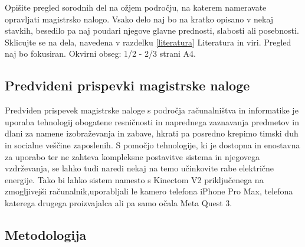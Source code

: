 \documentclass[a4paper, 12pt]{article}
\newcommand\cmnt[1]{\textcolor{munsell}{#1}}
\begin{document}
\cmnt{Opišite pregled sorodnih del na ožjem področju, na katerem nameravate opravljati magistrsko nalogo. Vsako delo naj bo na kratko opisano v nekaj stavkih, besedilo pa naj poudari njegove glavne prednosti, slabosti ali posebnosti. Sklicujte se na dela, navedena v razdelku \ref{literatura} Literatura in viri. Pregled naj bo fokusiran.  Okvirni obseg: 1/2 - 2/3 strani A4.}

\subsection{Predvideni prispevki magistrske naloge}

Predviden prispevek magistrske naloge s področja računalništva in informatike je uporaba
tehnologij obogatene resničnosti in naprednega zaznavanja predmetov in dlani za namene 
izobraževanja in zabave, hkrati pa posredno krepimo timski duh in socialne veščine 
zaposlenih. S pomočjo tehnologije, ki je dostopna in enostavna za uporabo ter ne zahteva
kompleksne postavitve sistema in njegovega vzdrževanja, se lahko tudi naredi nekaj na temo učinkovite rabe električne energije. Tako bi lahko sistem namesto s Kinectom
V2 priključenega na zmogljivejši računalnik,uporabljali le kamero telefona iPhone Pro Max, telefona katerega drugega proizvajalca ali
pa samo očala Meta Quest 3.
\subsection{Metodologija}
\end{document}

